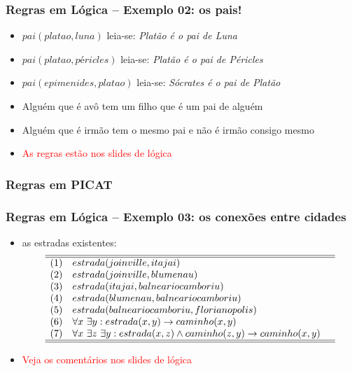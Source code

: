 \documentclass[10pt]{beamer}
\begin{document}
\begin{frame}
    \frametitle{Regras  em Lógica -- Exemplo 02: os pais!}
    \begin{itemize}
    
    \item $pai(platao, luna)$ \hspace{1.5cm} leia-se: \textit{Platão é o pai de Luna}
    \item $pai(platao, péricles)$ \hspace{1.5cm} leia-se: \textit{Platão é o pai de Péricles}
    \item $pai(epimenides, platao)$ \hspace{1.5cm} leia-se: \textit{Sócrates é o pai de Platão}
    
    \pause
    \item Alguém que é avô tem um filho que é um pai de alguém
    \pause
    \item Alguém que é irmão tem o mesmo pai e não é irmão consigo mesmo
    \pause
    \item \textcolor{red}{As regras estão nos slides de lógica}
    \end{itemize}
\end{frame}

\begin{frame}[allowframebreaks=0.9]
 \frametitle{Regras em PICAT}



\end{frame}



\begin{frame}
    \frametitle{Regras  em Lógica -- Exemplo 03: os conexões entre cidades}
    \begin{itemize}
    \item as estradas existentes:
  $$\begin{array}{lll} \hline\hline
	(1) & estrada(joinville, itajai) & \\
	(2) & estrada(joinville, blumenau) & \\
	(3) & estrada(itajai, balneariocamboriu) & \\
	(4) & estrada(blumenau, balneariocamboriu) & \\
	(5) & estrada(balneariocamboriu, florianopolis) & \\
	(6) & \forall x ~\exists y: estrada(x, y) \rightarrow caminho(x, y) & \\
	(7) & \forall x ~\exists z ~\exists y: estrada(x, z) \wedge caminho(z, y) \rightarrow caminho (x,y) &\\
	\hline\hline
	\end{array}$$	

    \item \textcolor{red}{Veja os comentários nos slides de lógica}
    \end{itemize}
\end{frame}
\end{document}
